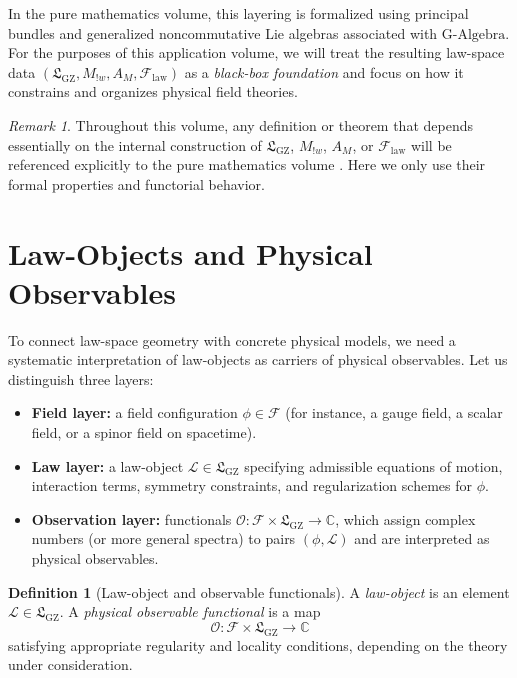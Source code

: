 \documentclass[11pt]{book}
\newcommand{\GAlgebra}{\text{G-Algebra}}
\newcommand{\GZLS}{\ensuremath{\mathfrak{L}_{\mathrm{GZ}}}}
\newcommand{\GZLT}{\ensuremath{M_{!w}}}
\newcommand{\GZLOC}{\ensuremath{A_M}}
\newcommand{\GZLCurv}{\ensuremath{\mathcal{F}_{\mathrm{law}}}}
\theoremstyle{plain}
\theoremstyle{definition}
\newtheorem{definition}[theorem]{Definition}
\theoremstyle{remark}
\newtheorem{remark}[theorem]{Remark}
\begin{document}
In the pure mathematics volume, this layering is formalized using
principal bundles and generalized noncommutative Lie algebras
associated with $\GAlgebra$. For the purposes of this application
volume, we will treat the resulting law-space data
$(\GZLS,\GZLT,\GZLOC,\GZLCurv)$ as a \emph{black-box foundation}
and focus on how it constrains and organizes physical field theories.

\begin{remark}
  Throughout this volume, any definition or theorem that depends
  essentially on the internal construction of $\GZLS$, $\GZLT$,
  $\GZLOC$, or $\GZLCurv$ will be referenced explicitly to the
  pure mathematics volume \cite{GaoZheng2025GFramework}. Here we
  only use their formal properties and functorial behavior.
\end{remark}

\section{Law-Objects and Physical Observables}
\label{sec:law-objects-observables}



To connect law-space geometry with concrete physical models, we need
a systematic interpretation of law-objects as carriers of physical
observables. Let us distinguish three layers:

\begin{itemize}
  \item \textbf{Field layer:} a field configuration
        $\phi \in \mathcal{F}$ (for instance, a gauge field, a scalar
        field, or a spinor field on spacetime).
  \item \textbf{Law layer:} a law-object $\mathcal{L} \in \GZLS$
        specifying admissible equations of motion, interaction terms,
        symmetry constraints, and regularization schemes for $\phi$.
  \item \textbf{Observation layer:} functionals
        $\mathcal{O}: \mathcal{F} \times \GZLS \to \mathbb{C}$,
        which assign complex numbers (or more general spectra)
        to pairs $(\phi,\mathcal{L})$ and are interpreted as
        physical observables.
\end{itemize}

\begin{definition}[Law-object and observable functionals]
  A \emph{law-object} is an element $\mathcal{L} \in \GZLS$.
  A \emph{physical observable functional} is a map
  \[
      \mathcal{O} \colon \mathcal{F} \times \GZLS \longrightarrow \mathbb{C}
  \]
  satisfying appropriate regularity and locality conditions, depending
  on the theory under consideration.
\end{definition}
\end{document}
